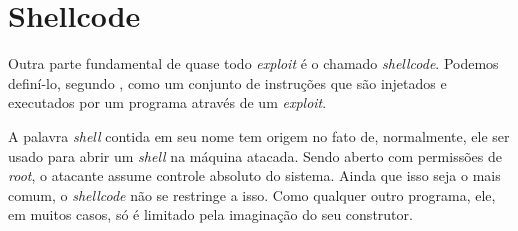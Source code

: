	\section{Shellcode}
	Outra parte fundamental de quase todo \textsl{exploit} é o chamado \textsl{shellcode}.
	Podemos definí-lo, segundo \cite{Anley2007}, como um conjunto de instruções que são injetados
	e executados por um programa através de um \textsl{exploit}. 


	A palavra \textsl{shell} contida em seu nome tem origem no fato de, normalmente, ele ser usado
	para abrir um \textsl{shell} na máquina atacada. Sendo aberto com permissões de \textsl{root},
	o atacante assume controle absoluto do sistema. Ainda que isso seja o mais comum, o \textsl{shellcode}
	não se restringe a isso. Como qualquer outro programa, ele, em muitos casos, só é limitado pela imaginação
	do seu construtor.
	
